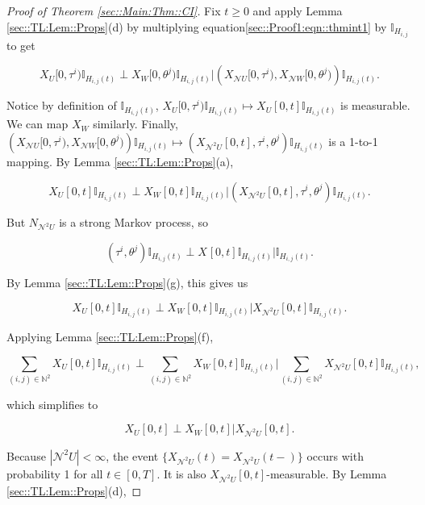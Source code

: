 \documentclass[12pt]{article}
\newcommand{\mb}{\mathbb}
\newcommand{\mc}{\mathcal}
\newcommand{\ind}{\hspace{24pt}}
\newcommand{\neigh}{\mc{N}}					%
\newcommand{\dneigh}{\mc{N}^2}				%
\renewcommand{\U}{U}							%
\newcommand{\UU}{W}								%
\newcommand{\T}{T}								%
\renewcommand{\t}{t}							%
\newcommand{\poiss}[1]{N_{#1}}						%
\newcommand{\rt}[1]{\tau^{#1}}						%
\newcommand{\rtt}[1]{\theta^{#1}}					%
\newcommand{\itt}{i}								%
\newcommand{\ittt}{j}								%
\newcommand{\rxvt}[2]{X_{#1}{(#2)}}					%
\newcommand{\rxvts}[2]{X_{#1}{#2}}					%
\newcommand{\pathseted}[2]{H_{#1,#2}}			%
\begin{document}
\begin{proof}[Proof of Theorem \ref{sec::Main:Thm::CI}]
\ind Fix \(\t \geq 0\) and apply Lemma \ref{sec::TL:Lem::Props}(d) by multiplying equation\eqref{sec::Proof1:eqn::thmint1} by \(\mb{I}_{\pathseted{\itt}{\ittt}}\) to get

\[\rxvts{\U}{[0,\rt{\itt})}\mb{I}_{\pathseted{\itt}{\ittt}(\t)}\perp\rxvts{\UU}{[0,\rtt{\ittt})}\mb{I}_{\pathseted{\itt}{\ittt}(\t)}\big|\left(\rxvts{\neigh{\U}}{[0,\rt{\itt})},\rxvts{\neigh{\UU}}{[0,\rtt{\ittt})}\right)\mb{I}_{\pathseted{\itt}{\ittt}(\t)}.\]


Notice by definition of \(\mb{I}_{\pathseted{\itt}{\ittt}(\t)}\), \(\rxvts{\U}{[0,\rt{\itt})}\mb{I}_{\pathseted{\itt}{\ittt}(\t)} \mapsto \rxvts{\U}{[0,t]}\mb{I}_{\pathseted{\itt}{\ittt}(\t)}\) is measurable. We can map \(\rxvts{\UU}{}\) similarly. Finally, \(\left(\rxvts{\neigh{\U}}{[0,\rt{\itt})},\rxvts{\neigh{\UU}}{[0,\rtt{\ittt})}\right)\mb{I}_{\pathseted{\itt}{\ittt}(\t)}\mapsto (\rxvts{\dneigh{\U}}{[0,t]}, \rt{\itt},\rtt{\ittt})\mb{I}_{\pathseted{\itt}{\ittt}(\t)}\) is a 1-to-1 mapping. By Lemma \ref{sec::TL:Lem::Props}(a),

\[\rxvts{\U}{[0,t]}\mb{I}_{\pathseted{\itt}{\ittt}(\t)}\perp\rxvts{\UU}{[0,t]}\mb{I}_{\pathseted{\itt}{\ittt}(\t)}\big|\left(\rxvts{\dneigh{\U}}{[0,t]},\rt{\itt},\rtt{\ittt}\right)\mb{I}_{\pathseted{\itt}{\ittt}(\t)}.\]

But \(\poiss{\dneigh{\U}}\) is a strong Markov process, so 

\[(\rt{\itt},\rtt{\ittt})\mb{I}_{\pathseted{\itt}{\ittt}(\t)}\perp \rxvts{}{[0,t]}\mb{I}_{\pathseted{\itt}{\ittt}(\t)}|\mb{I}_{\pathseted{\itt}{\ittt}(\t)}.\]

By Lemma \ref{sec::TL:Lem::Props}(g), this gives us

\[\rxvts{\U}{[0,t]}\mb{I}_{\pathseted{\itt}{\ittt}(\t)}\perp\rxvts{\UU}{[0,t]}\mb{I}_{\pathseted{\itt}{\ittt}(\t)}\big|\rxvts{\dneigh{\U}}{[0,t]}\mb{I}_{\pathseted{\itt}{\ittt}(\t)}.\]

Applying Lemma \ref{sec::TL:Lem::Props}(f),

\[\sum_{(\itt,\ittt)\in\mb{N}^2}\rxvts{\U}{[0,t]}\mb{I}_{\pathseted{\itt}{\ittt}(\t)}\perp\sum_{(\itt,\ittt)\in\mb{N}^2}\rxvts{\UU}{[0,t]}\mb{I}_{\pathseted{\itt}{\ittt}(\t)}\bigg|\sum_{(\itt,\ittt)\in\mb{N}^2}\rxvts{\dneigh{\U}}{[0,t]}\mb{I}_{\pathseted{\itt}{\ittt}(\t)},\]

which simplifies to 

\[\rxvts{\U}{[0,\t]}\perp\rxvts{\UU}{[0,\t]}\big|\rxvts{\dneigh{\U}}{[0,\t]}.\]

Because \(|\dneigh{\U}| < \infty\), the event \(\{\rxvt{\dneigh{\U}}{\t} = \rxvt{\dneigh{\U}}{\t-}\}\) occurs with probability 1 for all \(\t \in [0,\T]\). It is also \(\rxvts{\dneigh{\U}}{[0,\t]}\)-measurable. By Lemma \ref{sec::TL:Lem::Props}(d),


\end{proof}
\end{document}
